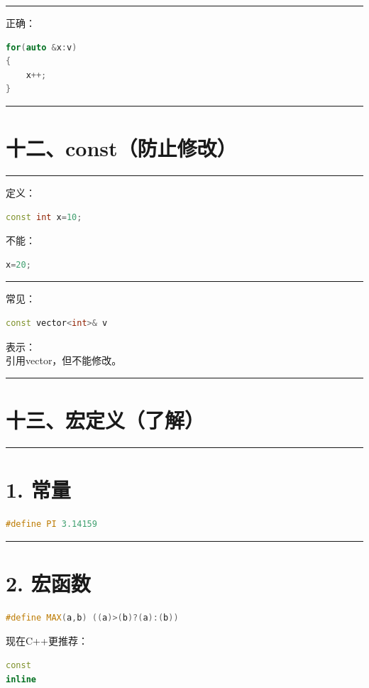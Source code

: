 \documentclass[10pt,twocolumn]{extarticle}
\begin{document}
\noindent\rule{\linewidth}{0.4pt}

正确：
\begin{lstlisting}[language=C++]
for(auto &x:v)
{
    x++;
}
\end{lstlisting}

\noindent\rule{\linewidth}{0.4pt}

\section{十二、const（防止修改）}

\noindent\rule{\linewidth}{0.4pt}

定义：
\begin{lstlisting}[language=C++]
const int x=10;
\end{lstlisting}
不能：
\begin{lstlisting}[language=C++]
x=20;
\end{lstlisting}

\noindent\rule{\linewidth}{0.4pt}

常见：
\begin{lstlisting}[language=C++]
const vector<int>& v
\end{lstlisting}
表示：\\
引用vector，但不能修改。

\noindent\rule{\linewidth}{0.4pt}

\section{十三、宏定义（了解）}

\noindent\rule{\linewidth}{0.4pt}

\section{1. 常量}
\begin{lstlisting}[language=C++]
#define PI 3.14159
\end{lstlisting}

\noindent\rule{\linewidth}{0.4pt}

\section{2. 宏函数}
\begin{lstlisting}[language=C++]
#define MAX(a,b) ((a)>(b)?(a):(b))
\end{lstlisting}
现在C++更推荐：
\begin{lstlisting}[language=C++]
const
inline
\end{lstlisting}
\end{document}
